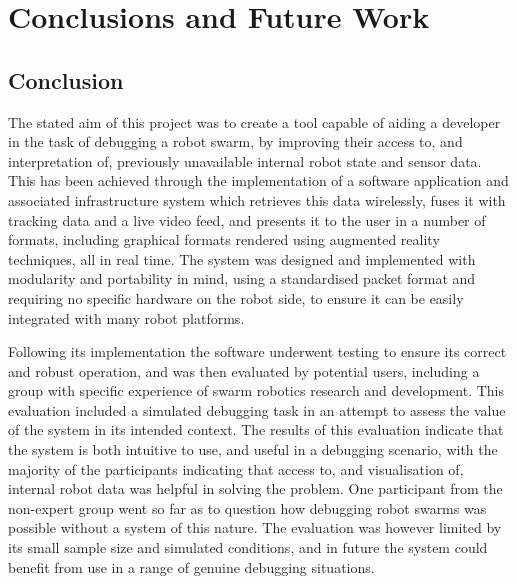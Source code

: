 
\chapter[Conclusions and Future Work]{Conclusions and Future Work} %

\label{ChapterConclusion} %


\section{Conclusion}

The stated aim of this project was to create a tool capable of aiding a developer in the task of debugging a robot swarm, by improving their access to, and interpretation of, previously unavailable internal robot state and sensor data. This has been achieved through the implementation of a software application and associated infrastructure system which retrieves this data wirelessly, fuses it with tracking data and a live video feed, and presents it to the user in a number of formats, including graphical formats rendered using augmented reality techniques, all in real time. The system was designed and implemented with modularity and portability in mind, using a standardised packet format and requiring no specific hardware on the robot side, to ensure it can be easily integrated with many robot platforms.

Following its implementation the software underwent testing to ensure its correct and robust operation, and was then evaluated by potential users, including a group with specific experience of swarm robotics research and development. This evaluation included a simulated debugging task in an attempt to assess the value of the system in its intended context. The results of this evaluation indicate that the system is both intuitive to use, and useful in a debugging scenario, with the majority of the participants indicating that access to, and visualisation of, internal robot data was helpful in solving the problem. One participant from the non-expert group went so far as to question how debugging robot swarms was possible without a system of this nature. The evaluation was however limited by its small sample size and simulated conditions, and in future the system could benefit from use in a range of genuine debugging situations.

